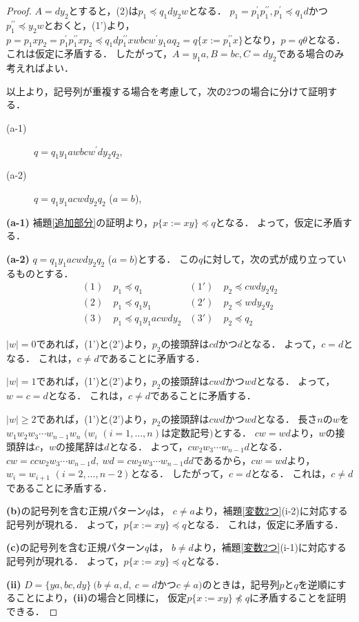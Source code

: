 \begin{proof}
$A=dy_{2}$とすると，(2)は$p_{1} \preceq q_{1}dy_{2}w$となる．
$p_{1}=p^{\prime}_{1}p^{\prime\prime}_{1}, p^{\prime}_{1} \preceq q_{1}d$かつ$p^{\prime\prime}_{1} \preceq y_{2}w$とおくと，(1')より，$p=p_{1}xp_{2}=p^{\prime}_{1}p^{\prime\prime}_{1}xp_{2} \preceq q_{1}dp^{\prime\prime}_{1}xwbcw^{\prime}y_{1}aq_{2}=q \{ x:=p^{\prime\prime}_{1}x \}$となり，$p=q\theta$となる．
これは仮定に矛盾する．
したがって，$A=y_{1}a,B=bc,C=dy_{2}$である場合のみ考えればよい．

以上より，記号列が重複する場合を考慮して，次の2つの場合に分けて証明する．

\begin{description}
\item[(a-1)] $q=q_{1}y_{1}awbcw^{\prime}dy_{2}q_{2}$,
\item[(a-2)] $q=q_{1}y_{1}acwdy_{2}q_{2}$ ($a=b$),
\end{description}

\textbf{(a-1)}
補題\ref{追加部分}の証明より，$p \{ x:= xy \} \preceq q$となる．
よって，仮定に矛盾する．

\textbf{(a-2)}
$q=q_{1}y_{1}acwdy_{2}q_{2}$ ($a=b$)とする．
この$q$に対して，次の式が成り立っているものとする．
\begin{align*}
(1)~& p_{1} \preceq q_{1} & (1')~& p_{2} \preceq cwdy_{2}q_{2} \\
(2)~& p_{1} \preceq q_{1}y_{1} & (2')~& p_{2} \preceq wdy_{2}q_{2} \\
(3)~& p_{1} \preceq q_{1}y_{1}acwdy_{2} & (3')~& p_{2} \preceq q_{2}
\end{align*}

$|w|=0$であれば，(1')と(2')より，$p_{2}$の接頭辞は$cd$かつ$d$となる．
よって，$c=d$となる．
これは，$c \not = d$であることに矛盾する．

$|w|=1$であれば，(1')と(2')より，$p_{2}$の接頭辞は$cwd$かつ$wd$となる．
よって，$w=c=d$となる．
これは，$c \not = d$であることに矛盾する．

$|w| \ge 2$であれば，(1')と(2')より，$p_{2}$の接頭辞は$cwd$かつ$wd$となる．
長さ$n$の$w$を$w_{1}w_{2}w_{3} \cdots w_{n-1}w_{n}$ $(w_{i}$ $(i=1, \ldots , n)$は定数記号$)$とする．
$cw=wd$より，$w$の接頭辞は$c$，$w$の接尾辞は$d$となる．
よって，$cw_{2}w_{3} \cdots w_{n-1}d$となる．
$cw=ccw_{2}w_{3} \cdots w_{n-1}d,~wd=cw_{2}w_{3} \cdots w_{n-1}dd$であるから，$cw=wd$より，$w_{i}=w_{i+1}$ $(i=2, \ldots , n-2)$となる．
したがって，$c=d$となる．
これは，$c \not = d$であることに矛盾する．

\textbf{(b)}の記号列を含む正規パターン$q$は，
$c \not = a$より，補題\ref{変数2つ}(i-2)に対応する記号列が現れる．
よって，$p \{ x:= xy \} \preceq q$となる．
これは，仮定に矛盾する．

\textbf{(c)}の記号列を含む正規パターン$q$は，
$b \not = d$より，補題\ref{変数2つ}(i-1)に対応する記号列が現れる．
よって，$p \{ x:= xy \} \preceq q$となる．

\noindent\textbf{(ii)}
$D=\{ ya, bc, dy \} \ (b \not = a,d,~c = d$かつ$c \not = a)$のときは，記号列$p$と$q$を逆順にすることにより，\textbf{(ii)}の場合と同様に， 仮定$p \{ x := xy \} \not\preceq q$に矛盾することを証明できる．
\end{proof}

